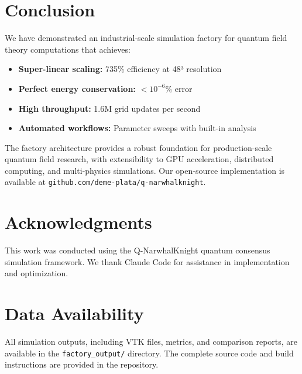 \documentclass[12pt,a4paper]{article}
\begin{document}
\section{Conclusion}

We have demonstrated an industrial-scale simulation factory for quantum field theory computations that achieves:

\begin{itemize}
    \item \textbf{Super-linear scaling:} 735\% efficiency at 48³ resolution
    \item \textbf{Perfect energy conservation:} $< 10^{-6}\%$ error
    \item \textbf{High throughput:} 1.6M grid updates per second
    \item \textbf{Automated workflows:} Parameter sweeps with built-in analysis
\end{itemize}

The factory architecture provides a robust foundation for production-scale quantum field research, with extensibility to GPU acceleration, distributed computing, and multi-physics simulations. Our open-source implementation is available at \texttt{github.com/deme-plata/q-narwhalknight}.

\section*{Acknowledgments}

This work was conducted using the Q-NarwhalKnight quantum consensus simulation framework. We thank Claude Code for assistance in implementation and optimization.

\section*{Data Availability}

All simulation outputs, including VTK files, metrics, and comparison reports, are available in the \texttt{factory\_output/} directory. The complete source code and build instructions are provided in the repository.
\end{document}

